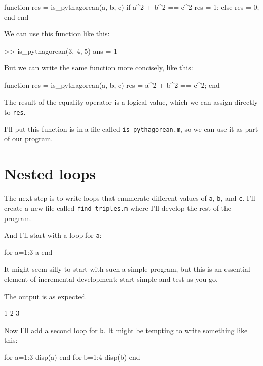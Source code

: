 \begin{code}
function res = is_pythagorean(a, b, c)
    if a^2 + b^2 == c^2
        res = 1;
    else
        res = 0;
    end
end
\end{code}

We can use this function like this:

\begin{code}
>> is_pythagorean(3, 4, 5)
ans = 1
\end{code}

But we can write the same function more concisely, like this:

\begin{code}
function res = is_pythagorean(a, b, c)
    res = a^2 + b^2 == c^2;
end
\end{code}

The result of the equality operator is a logical value, which we can assign directly 
to {\tt res}.

I'll put this function is in a file called \verb"is_pythagorean.m", so we can use it as part of our program.


\section{Nested loops}

The next step is to write loops that enumerate different values of {\tt a}, {\tt b}, and 
{\tt c}.  I'll create a new file called \verb"find_triples.m" where I'll develop the rest of the program.


And I'll start with a loop for {\tt a}:

\begin{code}
for a=1:3
    a
end
\end{code}

It might seem silly to start with such a simple program, but this is an essential element of incremental development: start simple and test as you go.

The output is as expected.

\begin{code}
1
2
3
\end{code}

Now I'll add a second loop for {\tt b}.  It might be tempting to write something like this:

\begin{code}
for a=1:3
    disp(a)
end
for b=1:4
    disp(b)
end
\end{code}

